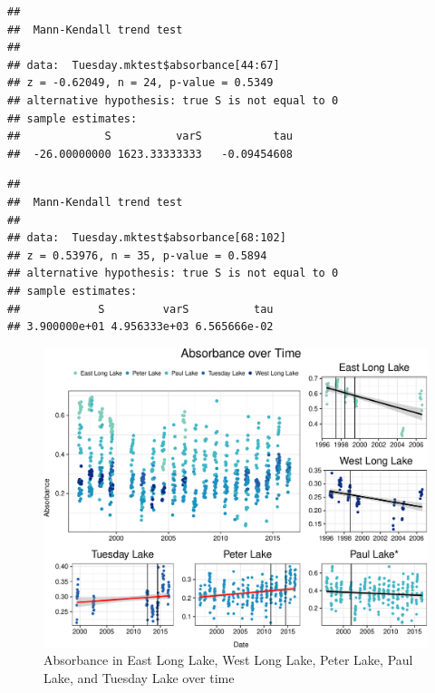 \documentclass[12pt,]{article}
\newenvironment{Shaded}{\begin{snugshade}}{\end{snugshade}}
\newcommand{\KeywordTok}[1]{\textcolor[rgb]{0.13,0.29,0.53}{\textbf{#1}}}
\newcommand{\DecValTok}[1]{\textcolor[rgb]{0.00,0.00,0.81}{#1}}
\newcommand{\CommentTok}[1]{\textcolor[rgb]{0.56,0.35,0.01}{\textit{#1}}}
\newcommand{\OperatorTok}[1]{\textcolor[rgb]{0.81,0.36,0.00}{\textbf{#1}}}
\newcommand{\NormalTok}[1]{#1}
\begin{document}
\begin{verbatim}
## 
##  Mann-Kendall trend test
## 
## data:  Tuesday.mktest$absorbance[44:67]
## z = -0.62049, n = 24, p-value = 0.5349
## alternative hypothesis: true S is not equal to 0
## sample estimates:
##             S          varS           tau 
##  -26.00000000 1623.33333333   -0.09454608
\end{verbatim}

\begin{Shaded}
\end{Shaded}

\begin{verbatim}
## 
##  Mann-Kendall trend test
## 
## data:  Tuesday.mktest$absorbance[68:102]
## z = 0.53976, n = 35, p-value = 0.5894
## alternative hypothesis: true S is not equal to 0
## sample estimates:
##            S         varS          tau 
## 3.900000e+01 4.956333e+03 6.565666e-02
\end{verbatim}

\begin{figure}
\centering
\includegraphics{Bash_ENV872_Project_files/figure-latex/time-1.pdf}
\caption{\label{fig:time} Absorbance in East Long Lake, West Long Lake,
Peter Lake, Paul Lake, and Tuesday Lake over time}
\end{figure}
\end{document}
